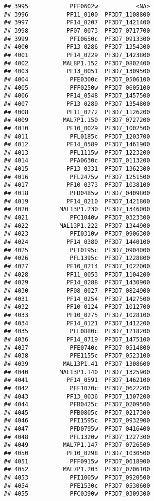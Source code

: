 \documentclass[12pt, a4paper]{article}\usepackage[]{graphicx}\usepackage[]{color}
\makeatletter
\newenvironment{kframe}{%
 \def\at@end@of@kframe{}%
 \ifinner\ifhmode%
  \def\at@end@of@kframe{\end{minipage}}%
  \begin{minipage}{\columnwidth}%
 \fi\fi%
 \def\FrameCommand##1{\hskip\@totalleftmargin \hskip-\fboxsep
 \colorbox{shadecolor}{##1}\hskip-\fboxsep
     \hskip-\linewidth \hskip-\@totalleftmargin \hskip\columnwidth}%
 \MakeFramed {\advance\hsize-\width
   \@totalleftmargin\z@ \linewidth\hsize
   \@setminipage}}%
 {\par\unskip\endMakeFramed%
 \at@end@of@kframe}
\newenvironment{knitrout}{}{} %
\makeatother
\begin{document}
\begin{knitrout}
\begin{kframe}
\begin{verbatim}
## 3995            PFF0602w           <NA>
## 3996           PF11_0100  PF3D7_1108800
## 3997           PF14_0207  PF3D7_1421400
## 3998           PF07_0073  PF3D7_0717700
## 3999            PFI0650c  PF3D7_0913300
## 4000           PF13_0286  PF3D7_1354300
## 4001           PF14_0229  PF3D7_1423800
## 4002          MAL8P1.152  PF3D7_0802400
## 4003           PF13_0051  PF3D7_1309500
## 4004            PFE0300c  PF3D7_0506100
## 4005            PFF0250w  PF3D7_0605100
## 4006           PF14_0548  PF3D7_1457500
## 4007           PF13_0289  PF3D7_1354800
## 4008           PF11_0272  PF3D7_1126200
## 4009          MAL7P1.150  PF3D7_0727200
## 4010           PF10_0029  PF3D7_1002500
## 4011            PFL0185c  PF3D7_1203700
## 4012           PF14_0589  PF3D7_1461900
## 4013            PFL1115w  PF3D7_1223200
## 4014            PFA0630c  PF3D7_0113200
## 4015           PF13_0331  PF3D7_1362300
## 4016            PFL2475w  PF3D7_1251500
## 4017           PF10_0373  PF3D7_1038100
## 4018            PFD0485w  PF3D7_0409800
## 4019           PF14_0210  PF3D7_1421800
## 4020         MAL13P1.230  PF3D7_1346000
## 4021            PFC1040w  PF3D7_0323300
## 4022         MAL13P1.222  PF3D7_1344900
## 4023            PFI0310w  PF3D7_0906300
## 4024           PF14_0380  PF3D7_1440100
## 4025            PFI0195c  PF3D7_0904000
## 4026            PFL1395c  PF3D7_1228800
## 4027           PF10_0214  PF3D7_1022000
## 4028           PF11_0053  PF3D7_1104200
## 4029           PF14_0288  PF3D7_1430900
## 4030           PF08_0027  PF3D7_0824900
## 4031           PF14_0254  PF3D7_1427500
## 4032           PF10_0124  PF3D7_1012700
## 4033           PF10_0275  PF3D7_1028100
## 4034           PF14_0121  PF3D7_1412200
## 4035            PFL0880c  PF3D7_1218200
## 4036           PF14_0719  PF3D7_1475100
## 4037            PFE0740c  PF3D7_0514800
## 4038            PFE1155c  PF3D7_0523100
## 4039          MAL13P1.41  PF3D7_1308600
## 4040         MAL13P1.140  PF3D7_1325900
## 4041           PF14_0591  PF3D7_1462100
## 4042            PFF1070c  PF3D7_0622200
## 4043           PF13_0036  PF3D7_1307200
## 4044            PFB0425c  PF3D7_0209500
## 4045            PFB0805c  PF3D7_0217300
## 4046            PFI1595c  PF3D7_0932900
## 4047            PFD0795w  PF3D7_0416400
## 4048            PFL1320w  PF3D7_1227300
## 4049          MAL7P1.147  PF3D7_0726500
## 4050           PF10_0298  PF3D7_1030500
## 4051            PFF0915w  PF3D7_0618900
## 4052          MAL7P1.203  PF3D7_0706100
## 4053            PFI1005w  PF3D7_0920500
## 4054            PFE1530c  PF3D7_0530600
## 4055            PFC0390w  PF3D7_0309300

\end{verbatim}
\end{kframe}
\end{knitrout}
\end{document}
